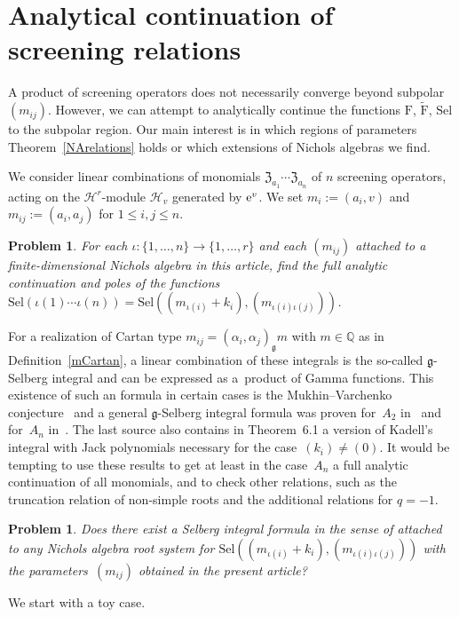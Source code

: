 \documentclass[pdftex]{sigma}%
\numberwithin{equation}{section}
\newtheorem{prob}[teo]{Problem}
\newcommand{\g}{\mathfrak{g}}
\newcommand{\zem}{\mathfrak{Z}}
\newcommand{\Sel}{\mathrm{Sel}}
\newcommand{\Fp}{\mathrm{F}}
\newcommand{\rFp}{\tilde{\mathrm{F}}}
\begin{document}
\section{Analytical continuation of screening relations}\label{section4}

A product of screening operators does not necessarily converge beyond subpolar~$(m_{ij})$. However, we can attempt to analytically continue the functions $\Fp$, $\rFp$, $\Sel$ to the subpolar region. Our main interest is in which regions of parameters Theorem~\ref{NArelations} holds or which extensions of Nichols algebras we find.

We consider linear combinations of monomials $\zem_{a_1}\cdots \zem_{a_n}$ of $n$ screening operators, acting on the $\mathcal{H}^r$-module $\mathcal{H}_{v}$ generated by ${\rm e}^v$. We set $m_i := (a_i, v)$ and $m_{ij} := (a_i, a_j)$ for $1 \leq i, j \leq n$.

\begin{prob} For each $\iota\colon \{1,\dots,n\}\to\{1,\dots,r\}$ and each $(m_{ij})$ attached to a finite-dimen\-sio\-nal Nichols algebra in this article, find the full analytic continuation and poles of the functions $\Sel(\iota(1)\cdots \iota(n))= \Sel((m_{\iota(i)}+k_i),(m_{\iota(i)\iota(j)}))$.
\end{prob}
For a realization of Cartan type $m_{ij}=(\alpha_i,\alpha_j)_\g m$ with $m\in \mathbb{Q}$ as in Definition~\ref{mCartan}, a linear combination of these integrals is the so-called $\g$-Selberg integral and can be expressed as a~product of Gamma functions. This existence of such an formula in certain cases is the Mukhin--Varchenko conjecture~\cite{MV00} and a general $\g$-Selberg integral formula was proven for~$A_2$ in~\cite{TV03} and for~$A_n$ in~\cite{War09}. The last source also contains in Theorem~6.1 a version of Kadell's integral with Jack polynomials necessary for the case~$(k_i)\neq (0)$. It would be tempting to use these results to get at least in the case~$A_n$ a full analytic continuation of all monomials, and to check other relations, such as the truncation relation of non-simple roots and the additional relations for $q=-1$.
\begin{prob}
Does there exist a Selberg integral formula in the sense of {\rm \cite{MV00,TV03,War09}} attached to any Nichols algebra root system for $\Sel((m_{\iota(i)}+k_i),(m_{\iota(i)\iota(j)}))$ with the parameters~$(m_{ij})$ obtained in the present article?
\end{prob}

We start with a toy case.
\end{document}
